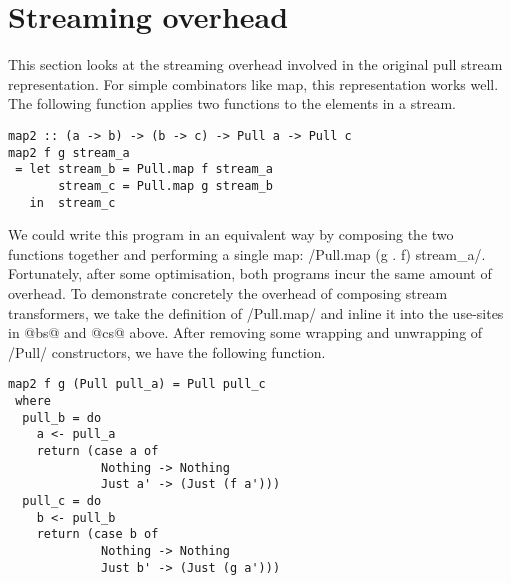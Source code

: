 % 
% 
% 



\section{Streaming overhead}

This section looks at the streaming overhead involved in the original pull stream representation.
For simple combinators like map, this representation works well.
The following function applies two functions to the elements in a stream.

\begin{lstlisting}
map2 :: (a -> b) -> (b -> c) -> Pull a -> Pull c
map2 f g stream_a
 = let stream_b = Pull.map f stream_a
       stream_c = Pull.map g stream_b
   in  stream_c
\end{lstlisting}

We could write this program in an equivalent way by composing the two functions together and performing a single map: \Hs/Pull.map (g . f) stream_a/.
Fortunately, after some optimisation, both programs incur the same amount of overhead.
To demonstrate concretely the overhead of composing stream transformers, we take the definition of \Hs/Pull.map/ and inline it into the use-sites in @bs@ and @cs@ above.
After removing some wrapping and unwrapping of \Hs/Pull/ constructors, we have the following function.

\begin{lstlisting}
map2 f g (Pull pull_a) = Pull pull_c
 where
  pull_b = do
    a <- pull_a
    return (case a of
             Nothing -> Nothing
             Just a' -> (Just (f a')))
  pull_c = do
    b <- pull_b
    return (case b of
             Nothing -> Nothing
             Just b' -> (Just (g a')))
\end{lstlisting}

